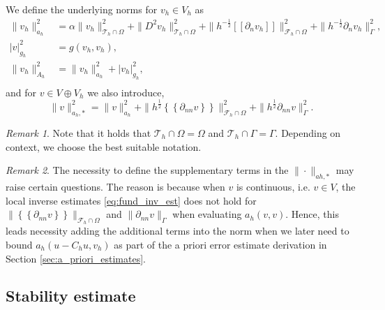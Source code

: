 \documentclass[11pt]{article}
\theoremstyle{remark}
\newtheorem*{remark}{Remark}
\newcommand{\mean}[1]{\left\{\!\!\left\{#1\right\}\!\!\right\}}
\newcommand{\jump}[1]{\left[\!\left[ #1 \right]\!\right]}
\newcommand{\abs}[1]{\left\lvert #1 \right\rvert}
\numberwithin{equation}{section}
\begin{document}
We define the underlying norms for $ v_{h} \in V_{h} $ as
    \begin{align}
        \label{eq:bi_ah_norm}
        \| v_h \|_{ a_{h} }^{ 2 } & =    \alpha \|   v_h \|_{ \mathcal{T} _{h} \cap \Omega  }^{ 2}  + \| D^2 v_h \|_{\mathcal{T} _{h} \cap \Omega   }^{ 2 } +  \| h^{-\frac{1}{2}} \jump{ \partial _{n} v_h }   \|_{ \mathcal{F}_{h}^{}\cap \Omega    }^{ 2
        } +  \| h^{-\frac{1}{2}}  \partial _{n} v_h    \|_{ \Gamma   }^{ 2 },    \\
        \label{eq:bi_gh_norm}
\abs{ v } _{g_{h}}^{2} & = g( v_h,v_h), \\
        \label{eq:bi_Ah_norm}
\| v_h \|_{A_{h}  }^{  2}  & = \| v_h \|_{ a_{h} }^{ 2 } + \abs{ v_h } _{g_{h}}^{2}, \\
    \end{align}
and for $v \in V \oplus V_{h}$ we also introduce,
\begin{equation}
    \label{eq:astarnorm}
\| v \|_{ a_{h}, * }^{  2}  =\| v \|_{ a_{h} }^{ 2 } +  \| h^{\frac{1}{2}} \mean{ \partial _{nn} v }   \|_{\mathcal{F} _{h}^{} \cap \Omega   }^{  2} +  \| h^{\frac{1}{2}} \partial _{nn} v    \|_{ \Gamma }^{  2}.
\end{equation}
\begin{remark}
Note that it holds that $\mathcal{T} _{h} \cap  \Omega   = \Omega  $ and $\mathcal{T} _{h} \cap  \Gamma  = \Gamma $. Depending on context, we choose the best suitable notation.
\end{remark}
\begin{remark}
    The necessity to define the supplementary terms in the $\| \cdot   \|_{a{h},* }^{ } $  may raise certain questions.  The reason is because when $v$ is continuous, i.e. $v \in V$, the local inverse estimates  \ref{eq:fund_inv_est} does not hold for $\| \mean{ \partial
    _{nn} v }  \|_{ \mathcal{F}_{h} \cap \Omega    }^{  }  $ and  $\|  \partial
    _{nn} v   \|_{ \Gamma }^{  }  $ when evaluating $a_{h}( v, v) $. Hence, this leads necessity adding the additional terms into the norm when we later need to bound $a_{h}( u - C_{h}u, v_{h}) $ as part of the a priori error estimate derivation in Section \ref{sec:a_priori_estimates}.
\end{remark}


\subsection{Stability estimate}%
\label{sub:stability_estimate}
\end{document}
